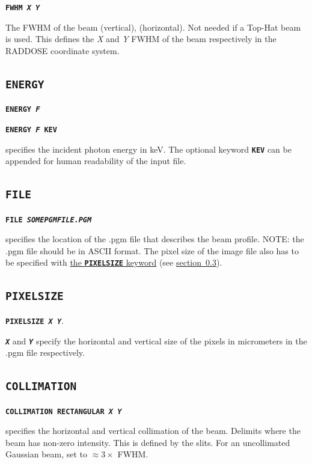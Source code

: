 \documentclass[a4paper]{article}
\newcommand{\Keyword}[1]{\texttt{\textbf{#1}}\xspace}
\newcommand{\SB}{\\[0.2em]}
\begin{document}
\label{beamfwhm}
\noindent \Keyword{FWHM \textit{X Y}}

The FWHM of the beam (vertical), (horizontal). Not needed if a Top-Hat beam is used.
This defines the \textit{X} and \textit{Y} FWHM of the beam respectively in the RADDOSE coordinate system.


\subsection{\Keyword{ENERGY}}

\noindent \Keyword{ENERGY \textit{F}}

\noindent \Keyword{ENERGY \textit{F} KEV}

specifies the incident photon energy in keV. The optional keyword \Keyword{KEV} can be appended for human readability of the input file.

\subsection{\Keyword{FILE}}
\label{file}

\noindent \Keyword{FILE \textit{SOMEPGMFILE.PGM}}

specifies the location of the .pgm file that describes the beam profile. NOTE: the .pgm file should be in ASCII format. The pixel size of the image file also has to be specified with \hyperref[pixelsize]{the \Keyword{PIXELSIZE} keyword} (see \hyperref[pixelsize]{section~\ref*{pixelsize}}).\SB

\subsection{\Keyword{PIXELSIZE}}
\label{pixelsize}

\noindent \Keyword{PIXELSIZE \textit{X Y}}.

\Keyword{\textit{X}} and \Keyword{\textit{Y}} specify the horizontal and vertical size of the pixels in micrometers in the .pgm file respectively.

\subsection{\Keyword{COLLIMATION}}

\noindent \Keyword{COLLIMATION RECTANGULAR \textit{X Y}}

specifies the horizontal and vertical collimation of the beam.
Delimits where the beam has non-zero intensity.
This is defined by the slits.
For an uncollimated Gaussian beam, set to $\approx 3 \times$ FWHM. \SB
\end{document}
